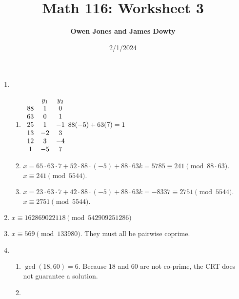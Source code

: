 \documentclass[10pt]{article}
\title{\bf Math 116: Worksheet 3}
\date{2/1/2024}
\author{\bf Owen Jones and James Dowty}
\begin{document}
\maketitle
\begin{enumerate}[label= \arabic*.]
    \item \begin{enumerate}
        \item $\begin{array}{c c c}
            & y_1 & y_2\\
            88 & 1 & 0\\
            63 & 0 & 1\\
            25 & 1 & -1\\
            13 & -2 & 3\\
            12 & 3 & -4\\
            1 & -5 & 7\\
        \end{array}\\
        88(-5)+63(7)=1$
        \item $x=65\cdot 63\cdot 7+52\cdot 88\cdot (-5)+88\cdot 63k=5785\equiv 241\pmod{88\cdot 63}$.\\
        $x\equiv 241\pmod{5544}$.
        \item $x=23\cdot 63\cdot 7+42\cdot 88\cdot (-5)+88\cdot 63k=-8337\equiv 2751\pmod{5544}$.\\
        $x\equiv2751\pmod{5544}$.
    \end{enumerate}
    \item $x\equiv 162869022118\pmod{542909251286}$
    \item $x\equiv 569\pmod{133980}$. They must all be pairwise coprime.
    \item \begin{enumerate}
        \item $\gcd(18,60)=6$. Because $18$ and $60$ are not co-prime, the CRT does not guarantee a solution.
        \item 
    \end{enumerate}
\end{enumerate}
\end{document}
